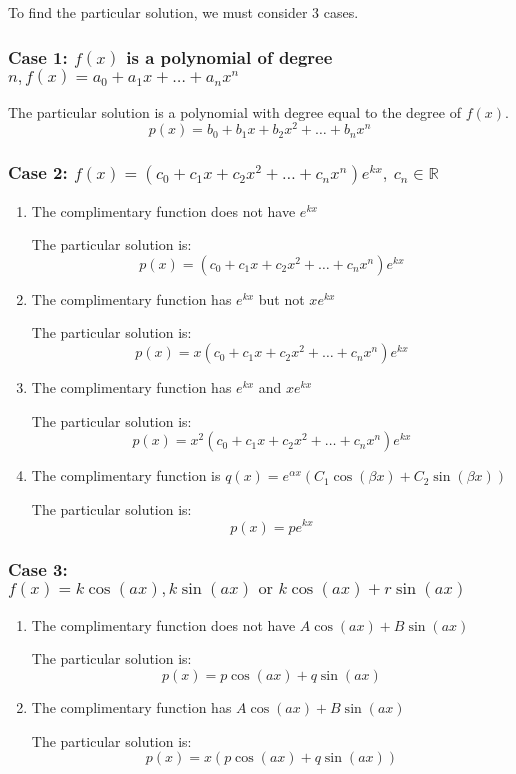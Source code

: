 \documentclass[11pt]{article}
\begin{document}
To find the particular solution, we must consider 3 cases.
\subsubsection{Case 1: \(f(x)\) is a polynomial of degree \(n, f(x) = a_0 + a_1 x + \ldots + a_n x^n\)}
\label{sec:org0ba081f}
The particular solution is a polynomial with degree equal to the degree of \(f(x)\).
\[p(x) = b_0 + b_1 x + b_2 x^2 + \ldots + b_n x^n\]
\subsubsection{Case 2: \(f(x) = (c_0 + c_1 x + c_2 x^2 + \ldots + c_n x^n) e^{kx}, \  c_n \in \mathbb{R}\)}
\label{sec:orgbdd16d6}

\begin{enumerate}
\item The complimentary function does not have \(e^{kx}\)
\label{sec:org5cac47a}

The particular solution is:
\[p(x) = (c_0 + c_1 x + c_2 x^2 + \ldots + c_n x^n) e^{kx}\]
\item The complimentary function has \(e^{kx}\) but not \(xe^{kx}\)
\label{sec:orgc22a7ff}

The particular solution is:
\[p(x) = x(c_0 + c_1 x + c_2 x^2 + \ldots + c_n x^n) e^{kx}\]
\item The complimentary function has \(e^{kx}\) and \(xe^{kx}\)
\label{sec:orgde4a965}

The particular solution is:
\[p(x) = x^2(c_0 + c_1 x + c_2 x^2 + \ldots + c_n x^n) e^{kx}\]
\item The complimentary function is \(q(x) = e^{\alpha x} (C_1 \cos (\beta x) + C_2 \sin (\beta x))\)
\label{sec:org75a3c50}

The particular solution is:
\[p(x) = pe^{kx}\]
\end{enumerate}
\subsubsection{Case 3: \(f(x) = k \cos (ax), k \sin (ax) \text{ or } k \cos (ax) + r \sin (ax)\)}
\label{sec:orgf563f7f}

\begin{enumerate}
\item The complimentary function does not have \(A \cos (ax) + B \sin (ax)\)
\label{sec:org8c68c88}

The particular solution is:
\[p(x) = p \cos (ax) + q \sin (ax)\]
\item The complimentary function has \(A \cos (ax) + B \sin (ax)\)
\label{sec:orgd36048b}

The particular solution is:
\[p(x) = x(p \cos (ax) + q \sin (ax))\]
\end{enumerate}
\end{document}
